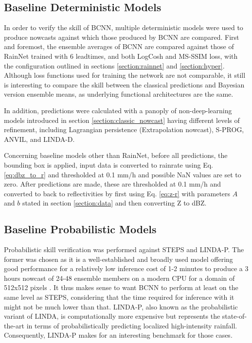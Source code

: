 \subsection{Baseline Deterministic Models}
\label{section:det_models}

In order to verify the skill of BCNN, multiple deterministic models were used to produce nowcasts against which those produced by BCNN are compared. First and foremost, the ensemble averages of BCNN are compared against those of RainNet trained with 6 leadtimes, and both LogCosh and MS-SSIM loss, with the configuration outlined in sections \ref{section:rainnet} and \ref{section:hyper}. Although loss functions used for training the network are not comparable, it still is interesting to compare the skill between the classical predictions and Bayesian version ensemble means, as underlying functional architectures are the same.

In addition, predictions were calculated with a panoply of non-deep-learning models introduced in section \ref{section:classic_nowcast} having different levels of refinement, including Lagrangian persistence (Extrapolation nowcast), S-PROG, ANVIL, and LINDA-D.

Concerning baseline models other than RainNet, before all predictions, the bounding box is applied, input data is converted to rainrate using Eq. \ref{eq:dbz_to_r} and thresholded at 0.1 mm/h and possible NaN values are set to zero. After predictions are made, these are thresholded at 0.1 mm/h and converted to back to reflectivities by first using Eq. \ref{eq:z-r} with parameters $A$ and $b$ stated in section \ref{section:data} and then converting Z to dBZ.


\subsection{Baseline Probabilistic Models}

Probabilistic skill verification was performed against STEPS and LINDA-P. The former was chosen as it is a well-established and broadly used model offering good performance for a relatively low inference cost of 1-2 minutes to produce a 3 hours nowcast of 24-48 ensemble members on a modern CPU for a domain of 512x512 pixels \cite{pulkkinen_pysteps_2019}. It thus makes sense to want BCNN to perform at least on the same level as STEPS, considering that the time required for inference with it might not be much lower than that. LINDA-P, also known as the probabilistic variant of LINDA, is computationally more expensive but represents the state-of-the-art in terms of probabilistically predicting localized high-intensity rainfall. Consequently, LINDA-P makes for an interesting benchmark for those cases. 

